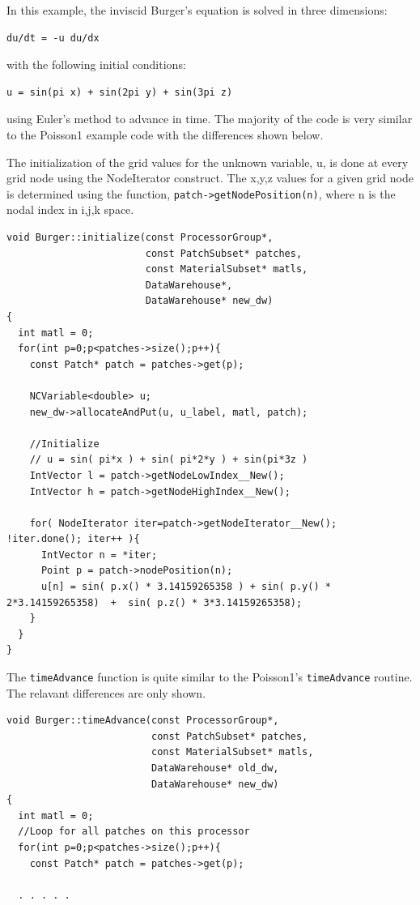 \documentclass[12pt]{report}
\begin{document}
In this example, the inviscid Burger's equation is solved in three dimensions:
\begin{Verbatim}[fontsize=\footnotesize]
	du/dt = -u du/dx  
\end{Verbatim}

with the following initial conditions:

\begin{Verbatim}[fontsize=\footnotesize]
	u = sin(pi x) + sin(2pi y) + sin(3pi z)
\end{Verbatim}

using Euler's method to advance in time.  The majority of the code is
very similar to the Poisson1 example code with the differences shown
below.

The initialization of the grid values for the unknown variable, u, is
done at every grid node using the NodeIterator construct.  The x,y,z
values for a given grid node is determined using the function,
\texttt{patch->getNodePosition(n)}, where n is the nodal index in
i,j,k space.

\begin{Verbatim}[fontsize=\footnotesize]
void Burger::initialize(const ProcessorGroup*,
                        const PatchSubset* patches,
                        const MaterialSubset* matls,
                        DataWarehouse*, 
                        DataWarehouse* new_dw)
{
  int matl = 0;
  for(int p=0;p<patches->size();p++){
    const Patch* patch = patches->get(p);

    NCVariable<double> u;
    new_dw->allocateAndPut(u, u_label, matl, patch);

    //Initialize
    // u = sin( pi*x ) + sin( pi*2*y ) + sin(pi*3z )
    IntVector l = patch->getNodeLowIndex__New();
    IntVector h = patch->getNodeHighIndex__New();
    
    for( NodeIterator iter=patch->getNodeIterator__New(); !iter.done(); iter++ ){
      IntVector n = *iter;
      Point p = patch->nodePosition(n);
      u[n] = sin( p.x() * 3.14159265358 ) + sin( p.y() * 2*3.14159265358)  +  sin( p.z() * 3*3.14159265358);
    }
  }
}

\end{Verbatim}

The \texttt{timeAdvance} function is quite similar to the Poisson1's
\texttt{timeAdvance} routine.  The relavant differences are only
shown.

\begin{Verbatim}[fontsize=\footnotesize]
void Burger::timeAdvance(const ProcessorGroup*,
                         const PatchSubset* patches,
                         const MaterialSubset* matls,
                         DataWarehouse* old_dw, 
                         DataWarehouse* new_dw)
{
  int matl = 0;
  //Loop for all patches on this processor
  for(int p=0;p<patches->size();p++){
    const Patch* patch = patches->get(p);
    
  . . . . .
\end{Verbatim}
\end{document}
